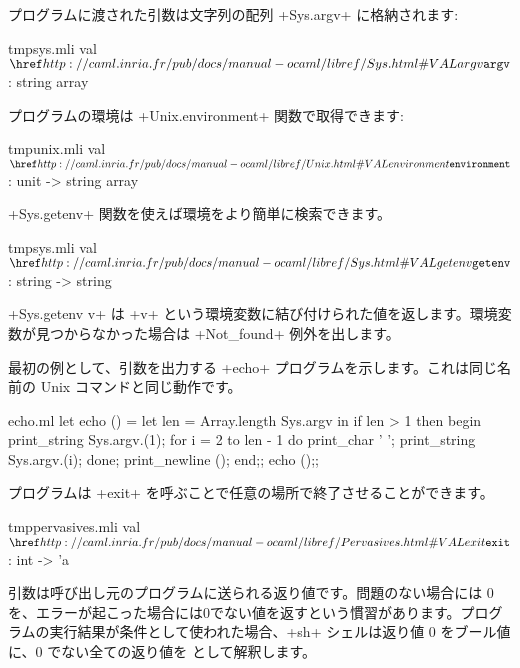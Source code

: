 プログラムに渡された引数は文字列の配列 \ml+Sys.argv+ に格納されます:
%
\begin{listingcodefile}{tmpsys.mli}
val $\indexlibvalue{Sys}{argv}$ : string array
\end{listingcodefile}
%
プログラムの環境は \ml+Unix.environment+ 関数で取得できます:
%
\begin{listingcodefile}{tmpunix.mli}
val $\indexlibvalue{Unix}{environment}$ : unit -> string array
\end{listingcodefile}
%
\ml+Sys.getenv+ 関数を使えば環境をより簡単に検索できます。
%
\begin{listingcodefile}{tmpsys.mli}
val $\indexlibvalue{Sys}{getenv}$ : string -> string
\end{listingcodefile}
%
\ml+Sys.getenv v+ は \ml+v+ という環境変数に結び付けられた値を返します。環境変数が見つからなかった場合は \ml+Not_found+ 例外を出します。
%
\begin{example}
最初の例として、引数を出力する \ml+echo+ プログラムを示します。これは同じ名前の Unix コマンドと同じ動作です。
\begin{listingcodefile}{echo.ml}
let echo () =
  let len = Array.length Sys.argv in
  if len > 1 then
    begin
      print_string Sys.argv.(1);
      for i = 2 to len - 1 do
        print_char ' ';
        print_string Sys.argv.(i);
      done;
      print_newline ();
    end;;
echo ();;
\end{listingcodefile}
\end{example}

プログラムは \ml+exit+ を呼ぶことで任意の場所で終了させることができます。
%
\begin{listingcodefile}{tmppervasives.mli}
val $\indexlibvalue{Pervasives}{exit}$ : int -> 'a
\end{listingcodefile}
%
引数は呼び出し元のプログラムに送られる返り値です。問題のない場合には 0 を、エラーが起こった場合には0でない値を返すという慣習があります。プログラムの実行結果が条件として使われた場合、\ml+sh+ シェルは返り値 0 をブール値  に、0 でない全ての返り値を  として解釈します。

